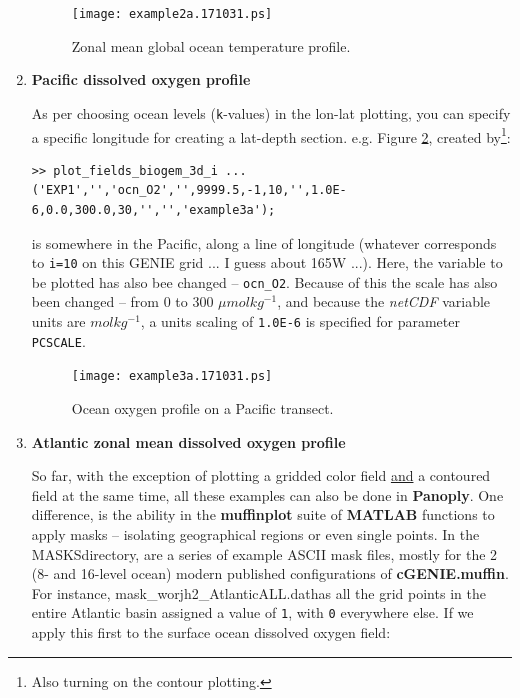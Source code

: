 \documentclass[11pt,fleqn]{book} %
\begin{document}
\begin{enumerate}[noitemsep]
\begin{figure}[ht]
\begin{center}
\texttt{[image: example2a.171031.ps]}
\end{center}
\vspace{-11mm}
\caption{Zonal mean global ocean temperature profile.}
\label{fig:example2a}
\end{figure}

\vspace{4pt}
\item \textbf{Pacific dissolved oxygen profile}

As per choosing ocean levels (\texttt{k}-values) in the lon-lat plotting, you can specify a specific longitude for creating a lat-depth section. e.g. Figure \ref{fig:example3a}, created by\footnote{Also turning on the contour plotting.}:

\footnotesize
\vspace{-0pt}\begin{verbatim}
>> plot_fields_biogem_3d_i ...
('EXP1','','ocn_O2','',9999.5,-1,10,'',1.0E-6,0.0,300.0,30,'','','example3a');
\end{verbatim}\vspace{-0pt}
\normalsize
is somewhere in the Pacific, along a line of longitude (whatever corresponds to \texttt{i=10} on this GENIE grid ... I guess about 165W ...). Here, the variable to be plotted has also bee changed -- \texttt{ocn\_O2}. Because of this the scale has also been changed -- from 0 to 300 \(\mu mol kg^{-1}\), and because the \textit{netCDF} variable units are \(mol kg^{-1}\), a units scaling of \texttt{1.0E-6} is specified for parameter \texttt{PCSCALE}.

\begin{figure}[ht]
\begin{center}
\texttt{[image: example3a.171031.ps]}
\end{center}
\vspace{-11mm}
\caption{Ocean oxygen profile on a Pacific transect.}
\label{fig:example3a}
\end{figure}

\vspace{4pt}
\item \textbf{Atlantic zonal mean dissolved oxygen profile}

So far, with the exception of plotting a gridded color field \uline{and} a contoured field at the same time, all these examples can also be done in \textbf{Panoply}. One difference, is the ability in the \textbf{muffinplot} suite of \textbf{MATLAB} functions to apply masks -- isolating geographical regions or even single points. In the \footnotesize\textsf{MASKS}\normalsize directory, are a series of example ASCII mask files, mostly for the 2 (8- and 16-level ocean) modern published configurations of \textbf{cGENIE.muffin}. For instance, \footnotesize\textsf{mask\_worjh2\_AtlanticALL.dat}\normalsize has all the grid points in the entire Atlantic basin assigned a value of \texttt{1}, with \texttt{0} everywhere else. If we apply this first to the surface ocean dissolved oxygen field:


\end{enumerate}
\end{document}
